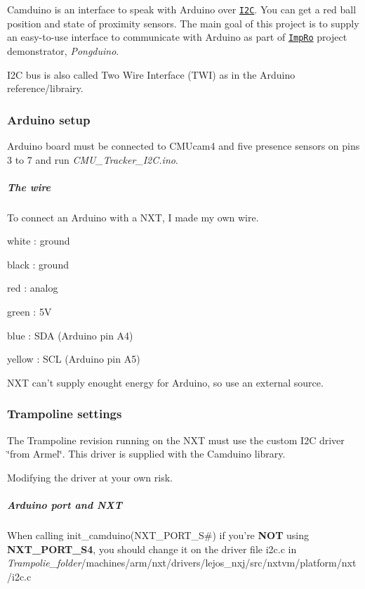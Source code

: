 Camduino is an interface to speak with Arduino over \href{https://en.wikipedia.org/wiki/I2c}{\tt I2\+C}. You can get a red ball position and state of proximity sensors. The main goal of this project is to supply an easy-\/to-\/use interface to communicate with Arduino as part of \href{http://anr-impro.irccyn.ec-nantes.fr/#description}{\tt Imp\+Ro} project demonstrator, {\itshape Pongduino}.

I2\+C bus is also called Two Wire Interface (T\+W\+I) as in the Arduino reference/librairy.

\subsubsection*{Arduino setup}

Arduino board must be connected to C\+M\+Ucam4 and five presence sensors on pins 3 to 7 and run {\itshape C\+M\+U\+\_\+\+Tracker\+\_\+\+I2\+C.\+ino}.

\subparagraph*{The wire}

To connect an Arduino with a N\+X\+T, I made my own wire.




\begin{DoxyItemize}
\item white \+: ground
\item black \+: ground
\item red \+: analog
\item green \+: 5\+V
\item blue \+: S\+D\+A (Arduino pin A4)
\item yellow \+: S\+C\+L (Arduino pin A5)
\end{DoxyItemize}

N\+X\+T can't supply enought energy for Arduino, so use an external source.

\subsubsection*{Trampoline settings}

The Trampoline revision running on the N\+X\+T must use the custom I2\+C driver \char`\"{}from
\+Armel\char`\"{}. This driver is supplied with the Camduino library.

Modifying the driver at your own risk.

\subparagraph*{Arduino port and N\+X\+T}

When calling {\ttfamily init\+\_\+camduino(N\+X\+T\+\_\+\+P\+O\+R\+T\+\_\+\+S\#)} if you're {\bfseries N\+O\+T} using {\bfseries N\+X\+T\+\_\+\+P\+O\+R\+T\+\_\+\+S4}, you should change it on the driver file i2c.\+c in {\itshape Trampolie\+\_\+folder}/machines/arm/nxt/drivers/lejos\+\_\+nxj/src/nxtvm/platform/nxt/i2c.c

